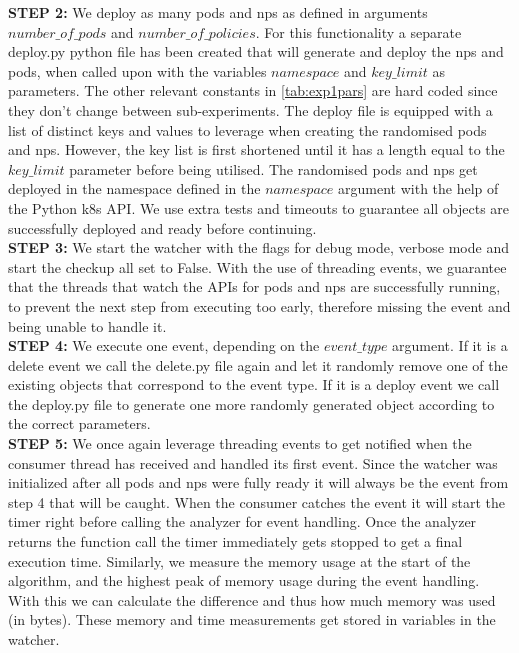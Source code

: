 \textbf{STEP 2:} We deploy as many pods and \acrshort{np}s as defined in arguments \newline $number\_of\_pods$ and $number\_of\_policies$. For this functionality a separate deploy.py python file has been created that will generate and deploy the \acrshort{np}s and pods, when called upon with the variables $namespace$ and $key\_limit$ as parameters. The other relevant constants in \autoref{tab:exp1pars} are hard coded since they don't change between sub-experiments. The deploy file is equipped with a list of distinct keys and values to leverage when creating the randomised pods and \acrshort{np}s. However, the key list is first shortened until it has a length equal to the $key\_limit$ parameter before being utilised. The randomised pods and \acrshort{np}s get deployed in the namespace defined in the $namespace$ argument with the help of the Python \acrshort{k8s} API. We use extra tests and timeouts to guarantee all objects are successfully deployed and ready before continuing.
\\[10pt]

\textbf{STEP 3:} We start the watcher with the flags for debug mode, verbose mode and start the checkup all set to False. With the use of threading events, we guarantee that the threads that watch the APIs for pods and \acrshort{np}s are successfully running, to prevent the next step from executing too early, therefore missing the event and being unable to handle it.
\\[10pt]

\textbf{STEP 4:} We execute one event, depending on the $event\_type$ argument. If it is a delete event we call the delete.py file again and let it randomly remove one of the existing objects that correspond to the event type. If it is a deploy event we call the deploy.py file to generate one more randomly generated object according to the correct parameters.
\\[10pt]

\textbf{STEP 5:} We once again leverage threading events to get notified when the consumer thread has received and handled its first event. Since the watcher was initialized after all pods and \acrshort{np}s were fully ready it will always be the event from step 4 that will be caught. When the consumer catches the event it will start the timer right before calling the analyzer for event handling. Once the analyzer returns the function call the timer immediately gets stopped to get a final execution time. Similarly, we measure the memory usage at the start of the algorithm, and the highest peak of memory usage during the event handling. With this we can calculate the difference and thus how much memory was used (in bytes). These memory and time measurements get stored in variables in the watcher.
\\[10pt]

